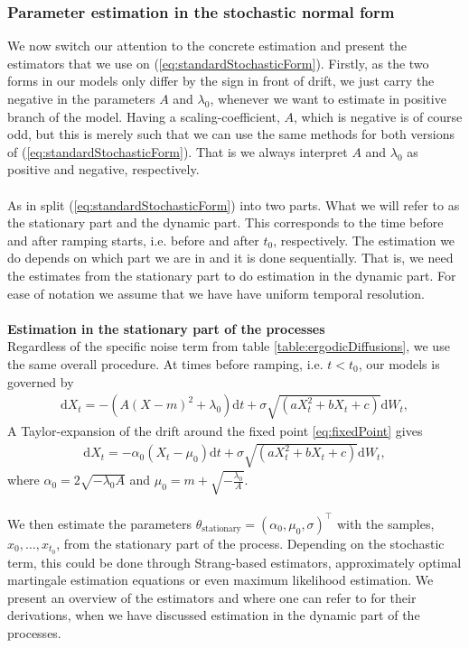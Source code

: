 \subsubsection{Parameter estimation in the stochastic normal form}
We now switch our attention to the concrete estimation and present the estimators that we use on (\ref{eq:standardStochasticForm}). Firstly, as the two forms in our models only differ by the sign in front of drift, we just carry the negative in the parameters $A$ and $\lambda_0$, whenever we want to estimate in positive branch of the model. Having a scaling-coefficient, $A$, which is negative is of course odd, but this is merely such that we can use the same methods for both versions of (\ref{eq:standardStochasticForm}). That is we always interpret $A$ and $\lambda_0$ as positive and negative, respectively.\\\\
As in \cite{Ditlevsen2023} split (\ref{eq:standardStochasticForm}) into two parts. What we will refer to as the stationary part and the dynamic part. This corresponds to the time before and after ramping starts, i.e. before and after $t_0$, respectively. The estimation we do depends on which part we are in and it is done sequentially. That is, we need the estimates from the stationary part to do estimation in the dynamic part. For ease of notation we assume that we have have uniform temporal resolution. \\\\
\textbf{Estimation in the stationary part of the processes}\\
Regardless of the specific noise term from table \ref{table:ergodicDiffusions}, we use the same overall procedure. At times before ramping, i.e. $t < t_0$, our models is governed by
\begin{align}
    \mathrm{d}X_t = -\left(A(X - m)^2 + \lambda_0\right)\mathrm{d}t + \sigma\sqrt{\left(aX_t^2 + bX_t + c\right)}\mathrm{d}W_t, 
\end{align}
A Taylor-expansion of the drift around the fixed point \ref{eq:fixedPoint} gives
\begin{align}
    \mathrm{d}X_t = -\alpha_0\left(X_t - \mu_0\right)\mathrm{d}t + \sigma\sqrt{\left(aX_t^2 + bX_t + c\right)}\mathrm{d}W_t, \label{eq:TaylorStationary}
\end{align}
where $\alpha_0 = 2\sqrt{-\lambda_0 A}$ and $\mu_0 = m + \sqrt{-\frac{\lambda_0}{A}}$.\\\\
We then estimate the parameters $\theta_{\mathrm{stationary}} = (\alpha_0, \mu_0, \sigma)^\top$ with the samples, $x_{0}, \dots, x_{t_0}$, from the stationary part of the process. Depending on the stochastic term, this could be done through Strang-based estimators, approximately optimal martingale estimation equations or even maximum likelihood estimation. We present an overview of the estimators and where one can refer to for their derivations, when we have discussed estimation in the dynamic part of the processes.\\
